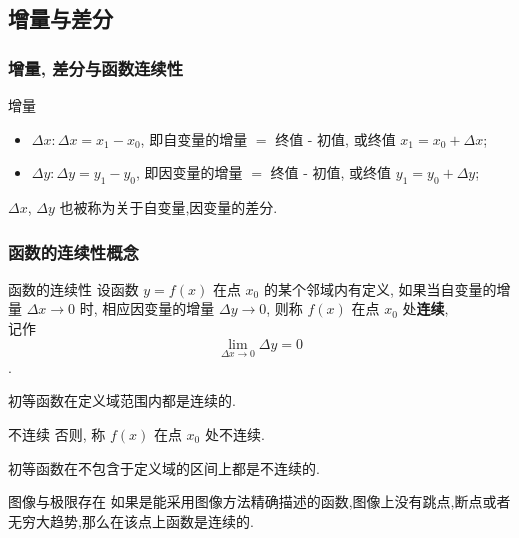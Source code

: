 \documentclass[
10pt,
aspectratio=43,
]{beamer}
\begin{document}
\subsection{增量与差分}

\begin{frame}
	\frametitle{增量, 差分与函数连续性}
	\begin{block}{增量}
		\begin{itemize}
			\item $\Delta x: \Delta x=x_1-x_0$, 即自变量的增量 $=$ 终值 - 初值, 或终值 $x_1=x_0+\Delta x$;
			\item $\Delta y: \Delta y=y_1-y_0$, 即因变量的增量 $=$ 终值 - 初值, 或终值 $y_1=y_0+\Delta y$;
		\end{itemize}
		$\Delta x$, $\Delta y$ 也被称为关于自变量,因变量的差分.
	\end{block}
\end{frame}

\begin{frame}
	\frametitle{函数的连续性概念}
	\begin{block}{函数的连续性}
		设函数 $y=f(x)$ 在点 $x_0$ 的某个邻域内有定义, 如果当自变量的增量 $\Delta x \rightarrow 0$ 时, 相应因变量的增量 $\Delta y \rightarrow 0$, 则称 $f(x)$ 在点 $x_0$ 处\textbf{连续},\\
		记作 $$\lim _{\Delta x \rightarrow 0} \Delta y=0$$. 
	\end{block}
	\pause
	初等函数在定义域范围内都是连续的.
	\pause
	\begin{exampleblock}{不连续}
		否则, 称 $f(x)$ 在点 $x_0$ 处不连续.
	\end{exampleblock}
	\pause
	初等函数在不包含于定义域的区间上都是不连续的.
	
	\begin{alertblock}{图像与极限存在}
		如果是能采用图像方法精确描述的函数,图像上没有跳点,断点或者无穷大趋势,那么在该点上函数是连续的.
	\end{alertblock}
	
\end{frame}
\end{document}
